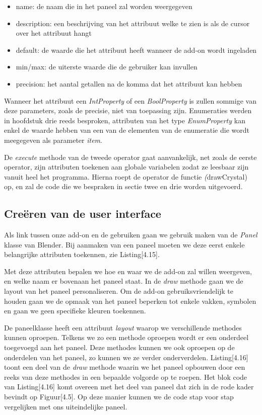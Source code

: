 \begin{itemize}
\item name: de naam die in het paneel zal worden weergegeven
\item description: een beschrijving van het attribuut welke te zien is als de cursor over het attribuut hangt
\item default: de waarde die het attribuut heeft wanneer de add-on wordt ingeladen
\item min/max: de uiterste waarde die de gebruiker kan invullen
\item precision: het aantal getallen na de komma dat het attribuut kan hebben
\end{itemize}  

Wanneer het attribuut een \textit{IntProperty} of een \textit{BoolProperty} is zullen sommige van deze parameters, zoals de precisie, niet van toepassing zijn. Enumeraties werden in hoofdstuk drie reeds besproken, attributen van het type \textit{EnumProperty} kan enkel de waarde hebben van een van de elementen van de enumeratie die wordt meegegeven als parameter \textit{item}.
\par
De \textit{execute} methode van de tweede operator gaat aanvankelijk, net zoals de eerste operator, zijn attributen toekenen aan globale variabelen zodat ze leesbaar zijn vanuit heel het programma. Hierna roept de operator de functie \textit(drawCrystal) op, en zal de code die we bespraken in sectie twee en drie  worden uitgevoerd.  

\subsection{Creëren van de user interface}
Als link tussen onze add-on en de gebruiken gaan we gebruik maken van de \textit{Panel} klasse van Blender. Bij aanmaken van een paneel moeten we deze eerst enkele belangrijke attributen toekennen, zie Listing[4.15].
 


Met deze attributen bepalen we hoe en waar we de add-on zal willen weergeven, en welke naam er bovenaan het paneel staat. In de \textit{draw} methode gaan we de layout van het paneel personaliseren. Om de add-on gebruiksvriendelijk te houden gaan we de opmaak van het paneel beperken tot enkele vakken, symbolen en gaan we geen specifieke kleuren toekennen.
\par
De paneelklasse heeft een attribuut \textit{layout} waarop we verschillende methodes kunnen oproepen. Telkens we zo een methode oproepen wordt er een onderdeel toegevoegd aan het paneel. Deze methodes kunnen we ook oproepen op de onderdelen van het paneel, zo kunnen we ze verder onderverdelen. Listing[4.16] toont een deel van de \textit{draw} methode waarin we het paneel opbouwen door een reeks van deze methodes in een bepaalde volgorde op te roepen. Het blok code van Listing[4.16] komt overeen met het deel van paneel dat zich in de rode kader bevindt op Figuur[4.5]. Op deze manier kunnen we de code stap voor stap vergelijken met ons uiteindelijke paneel.   

